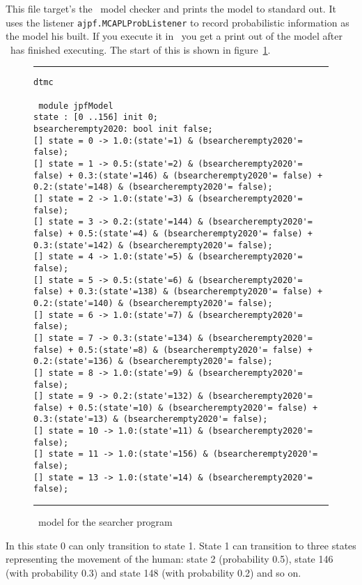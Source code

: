 \documentclass[a4]{article}
\begin{document}
This file target's the \prism\ model checker and prints the model to standard out.  It uses the listener \texttt{ajpf.MCAPLProbListener} to record probabilistic information as the model his built.  If you execute it in \ajpf\ you get a print out of the model after \ajpf\  has finished executing.  The start of this is shown in figure~\ref{fig:prism_output2}.

\begin{figure}
\noindent\rule{\textwidth}{1pt}
\begin{small}
\begin{verbatim}
dtmc

 module jpfModel
state : [0 ..156] init 0;
bsearcherempty2020: bool init false;
[] state = 0 -> 1.0:(state'=1) & (bsearcherempty2020'= false);
[] state = 1 -> 0.5:(state'=2) & (bsearcherempty2020'= false) + 0.3:(state'=146) & (bsearcherempty2020'= false) + 0.2:(state'=148) & (bsearcherempty2020'= false);
[] state = 2 -> 1.0:(state'=3) & (bsearcherempty2020'= false);
[] state = 3 -> 0.2:(state'=144) & (bsearcherempty2020'= false) + 0.5:(state'=4) & (bsearcherempty2020'= false) + 0.3:(state'=142) & (bsearcherempty2020'= false);
[] state = 4 -> 1.0:(state'=5) & (bsearcherempty2020'= false);
[] state = 5 -> 0.5:(state'=6) & (bsearcherempty2020'= false) + 0.3:(state'=138) & (bsearcherempty2020'= false) + 0.2:(state'=140) & (bsearcherempty2020'= false);
[] state = 6 -> 1.0:(state'=7) & (bsearcherempty2020'= false);
[] state = 7 -> 0.3:(state'=134) & (bsearcherempty2020'= false) + 0.5:(state'=8) & (bsearcherempty2020'= false) + 0.2:(state'=136) & (bsearcherempty2020'= false);
[] state = 8 -> 1.0:(state'=9) & (bsearcherempty2020'= false);
[] state = 9 -> 0.2:(state'=132) & (bsearcherempty2020'= false) + 0.5:(state'=10) & (bsearcherempty2020'= false) + 0.3:(state'=13) & (bsearcherempty2020'= false);
[] state = 10 -> 1.0:(state'=11) & (bsearcherempty2020'= false);
[] state = 11 -> 1.0:(state'=156) & (bsearcherempty2020'= false);
[] state = 13 -> 1.0:(state'=14) & (bsearcherempty2020'= false);
\end{verbatim}
\end{small}
\noindent\rule{\textwidth}{1pt}
\caption{\prism\ model for the searcher program}
\label{fig:prism_output2}
\end{figure}

In this state 0 can only transition to state 1.  State 1 can transition to three states representing the movement of the human: state 2 (probability 0.5), state 146 (with probability 0.3) and state 148 (with probability 0.2) and so on.
\end{document}
